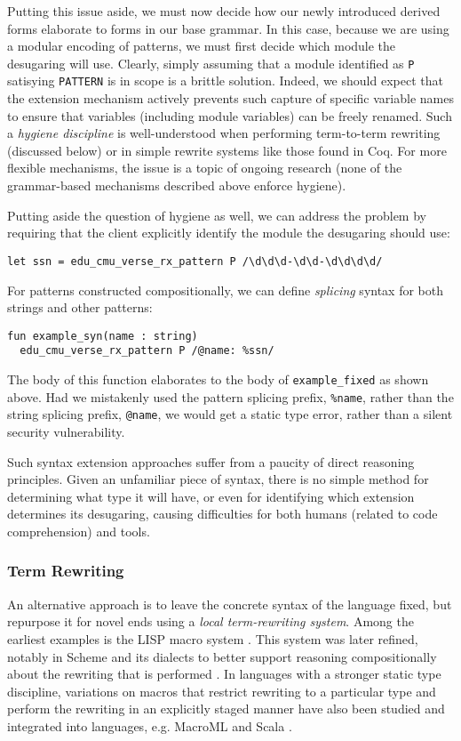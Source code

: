 Putting this issue aside, we must now decide how our newly introduced derived forms elaborate to forms in our base grammar. In this case, because we are using a modular encoding of patterns, we must first decide which module the desugaring will use. Clearly, simply assuming that a module identified as \lstinline{P} satisying \lstinline{PATTERN} is in scope is a brittle solution. Indeed, we should expect that the extension mechanism actively prevents such capture of specific variable names to ensure that variables (including module variables) can be freely renamed. Such a \emph{hygiene discipline} is well-understood when performing term-to-term rewriting (discussed below) or in simple rewrite systems like those found in Coq. For more flexible mechanisms, the issue is a topic of ongoing research (none of the grammar-based mechanisms described above enforce hygiene).

Putting aside the question of hygiene as well, we can address the problem by requiring that the client explicitly identify the module the desugaring should use:
\begin{lstlisting}[numbers=none]
let ssn = edu_cmu_verse_rx_pattern P /\d\d\d-\d\d-\d\d\d\d/
\end{lstlisting}
For patterns constructed compositionally, we can define \emph{splicing} syntax for both strings and other patterns:
\begin{lstlisting}[numbers=none,escapechar=|]
fun example_syn(name : string)
  edu_cmu_verse_rx_pattern P /@name: %ssn/
\end{lstlisting}
The body of this function elaborates to the body of \lstinline{example_fixed} as shown above. Had we mistakenly used the pattern splicing prefix, \lstinline{%name}, rather than the string splicing prefix, \lstinline{@name}, we would get a static type error, rather than a silent security vulnerability.

Such syntax extension approaches suffer from a paucity of direct reasoning principles. Given an unfamiliar piece of syntax, there is no simple method for determining what type it will have, or even for identifying which extension determines its desugaring, causing difficulties for both humans (related to code comprehension) and tools.

\subsubsection{Term Rewriting}
An alternative approach is to leave the concrete syntax of the language fixed, but repurpose it for novel ends using a \emph{local term-rewriting system}. Among the earliest examples is the LISP macro system \cite{Hart63a}. This system was later refined, notably in Scheme and its dialects to better support reasoning compositionally about the rewriting that is performed \cite{Kohlbecker86a}. In languages with a stronger static type discipline, variations on macros that restrict rewriting to a particular type and perform the rewriting in an explicitly staged manner have also been studied \cite{Herman10:Theory,ganz2001macros} and integrated into languages, e.g. MacroML \cite{ganz2001macros} and Scala \cite{ScalaMacros2013}. 

